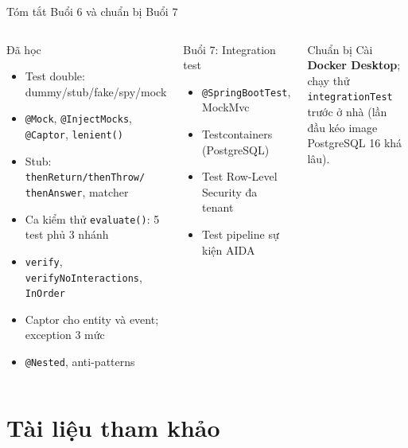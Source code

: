 \documentclass[aspectratio=169,12pt]{beamer}
\begin{document}
\begin{frame}[shrink]{Tóm tắt Buổi 6 và chuẩn bị Buổi 7}
  \begin{columns}
    \begin{block}{Đã học}
      \begin{itemize}\small
        \item Test double: dummy/stub/fake/spy/mock
        \item \texttt{@Mock}, \texttt{@InjectMocks}, \texttt{@Captor}, \texttt{lenient()}
        \item Stub: \texttt{thenReturn/\allowbreak thenThrow/\allowbreak
          thenAnswer}, matcher
        \item Ca kiểm thử \texttt{evaluate()}: 5 test phủ 3 nhánh
        \item \texttt{verify}, \texttt{verifyNoInteractions}, \texttt{InOrder}
        \item Captor cho entity và event; exception 3 mức
        \item \texttt{@Nested}, anti-patterns
      \end{itemize}
    \end{block}

    \begin{block}{Buổi 7: Integration test}
      \begin{itemize}\small
        \item \texttt{@SpringBootTest}, MockMvc
        \item Testcontainers (PostgreSQL)
        \item Test Row-Level Security đa tenant
        \item Test pipeline sự kiện AIDA
      \end{itemize}
    \end{block}
    \begin{alertblock}{Chuẩn bị}
      \small Cài \textbf{Docker Desktop}; chạy thử
      \texttt{integrationTest} trước ở nhà (lần đầu kéo image
      PostgreSQL 16 khá lâu).
    \end{alertblock}
  \end{columns}
\end{frame}

\section{Tài liệu tham khảo}
\end{document}
